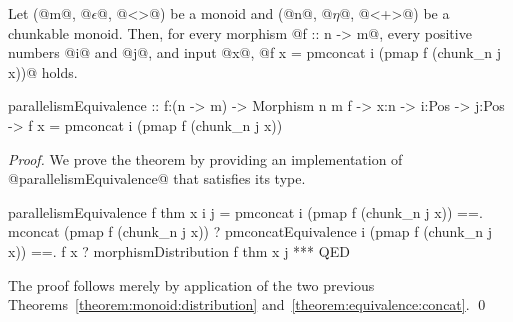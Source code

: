 %
\begin{theorem}\label{theorem:two-level}
Let (@m@, @$\epsilon$@, @<>@) be a monoid
and (@n@, @$\eta$@, @<+>@) be a chunkable monoid.
%
Then, for every morphism @f :: n -> m@,
every positive numbers @i@ and @j@, and input @x@,
@f x = pmconcat i (pmap f (chunk_n j x))@ holds.
%
\begin{code}
parallelismEquivalence
  :: f:(n -> m) -> Morphism n m f -> x:n -> i:Pos -> j:Pos
  -> {f x = pmconcat i (pmap f (chunk_n j x))}
\end{code}
\end{theorem}

\begin{proof}
We prove the theorem by providing an implementation of
@parallelismEquivalence@ that satisfies its type.
%
\begin{code}
parallelismEquivalence f thm x i j
  =   pmconcat i (pmap f (chunk_n j x))
  ==. mconcat (pmap f (chunk_n j x))
      ? pmconcatEquivalence i (pmap f (chunk_n j x))
  ==. f x
      ? morphismDistribution f thm x j
  *** QED
\end{code}
The proof follows merely by application of the 
two previous Theorems~\ref{theorem:monoid:distribution} and~\ref{theorem:equivalence:concat}.
\qed\end{proof}


